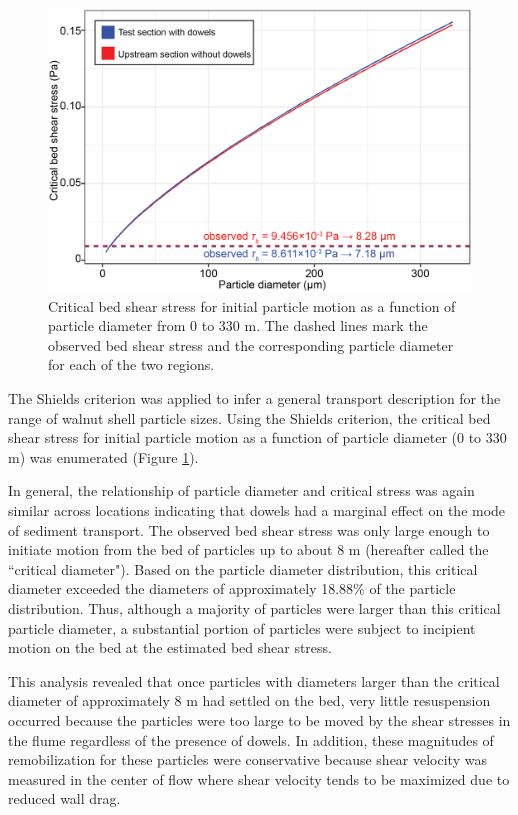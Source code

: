 \documentclass[12pt]{article}
\begin{document}
\begin{figure}[H]
    \centering
    \includegraphics{shields.png}
    \caption{Critical bed shear stress for initial particle motion as a function of particle diameter from 0 to 330 \textmu m. The dashed lines mark the observed bed shear stress and the corresponding particle diameter for each of the two regions.}
    \label{fig_shields}
\end{figure}

The Shields criterion was applied to infer a general transport description for the range of walnut shell particle sizes. Using the Shields criterion, the critical bed shear stress for initial particle motion as a function of particle diameter (0 to 330 \textmu m) was enumerated (Figure \ref{fig_shields}).

In general, the relationship of particle diameter and critical stress was again similar across locations indicating that dowels had a marginal effect on the mode of sediment transport. The observed bed shear stress was only large enough to initiate motion from the bed of particles up to about 8 \textmu m (hereafter called the ``critical diameter"). Based on the particle diameter distribution, this critical diameter exceeded the diameters of approximately 18.88\% of the particle distribution. Thus, although a majority of particles were larger than this critical particle diameter, a substantial portion of particles were subject to incipient motion on the bed at the estimated bed shear stress.

This analysis revealed that once particles with diameters larger than the critical diameter of approximately 8 \textmu m had settled on the bed, very little resuspension occurred because the particles were too large to be moved by the shear stresses in the flume regardless of the presence of dowels. In addition, these magnitudes of remobilization for these particles were conservative because shear velocity was measured in the center of flow where shear velocity tends to be maximized due to reduced wall drag.
\end{document}
